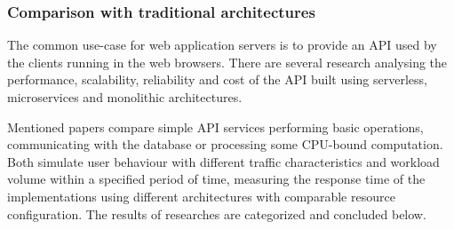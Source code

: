 


\subsubsection*{Comparison with traditional architectures} \label{chapter:comparison-with-traditional-architectures}

The common use-case for web application servers is to provide an API used by the clients running in the web browsers.
There are several research \cite{ServerlessComputingAnInvestigationOfDeploymentEnvironmentsForWebAPIs}\cite{MicroservicesvsServerlessAPerformanceComparisonOnCloudNativeWebApplication} analysing the performance, scalability, reliability and cost of the API built using serverless, microservices and monolithic architectures.

Mentioned papers compare simple API services performing basic operations, communicating with the database or processing some CPU-bound computation.
Both simulate user behaviour with different traffic characteristics and workload volume within a specified period of time, measuring the response time of the implementations using different architectures with comparable resource configuration. The results of researches are categorized and concluded below.




